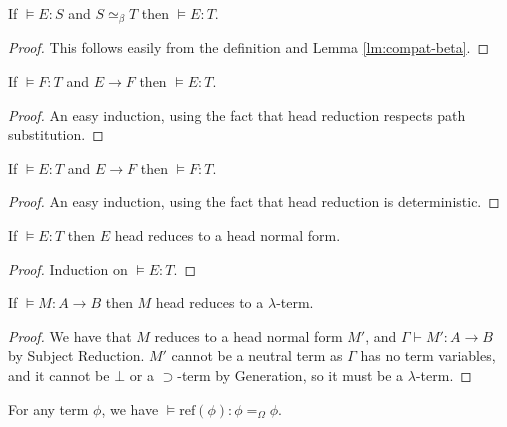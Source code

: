\documentclass[a4paper,UKenglish]{lipics-v2016}
\newcommand*{\reff}[1]{\ensuremath{\mathrm{ref} \left( {#1} \right)}}
\theoremstyle{plain}
\begin{document}
\begin{lemma}
\label{lm:conv-compute}
If $\models E : S$ and $S \simeq_\beta T$ then $\models E : T$.
\end{lemma}

\begin{proof}
This follows easily from the definition and Lemma \ref{lm:compat-beta}.
\end{proof}

\begin{lemma}
If $\models F : T$ and $E \rightarrow F$ then $\models E : T$.
\end{lemma}

\begin{proof}
An easy induction, using the fact that head reduction respects path substitution.
\end{proof}

\begin{lemma}[Reduction]
If $\models E : T$ and $E \rightarrow F$ then $\models F : T$.
\end{lemma}

\begin{proof}
An easy induction, using the fact that head reduction is deterministic.
\end{proof}

\begin{lemma}
If $\models E : T$ then $E$ head reduces to a head normal form.
\end{lemma}

\begin{proof}
Induction on $\models E : T$.
\end{proof}

\begin{lemma}
\label{lm:compute-lambda}
If $\models M : A \rightarrow B$ then $M$ head reduces to a $\lambda$-term.
\end{lemma}

\begin{proof}
We have that $M$ reduces to a head normal form $M'$, and $\Gamma \vdash M' : A \rightarrow B$ by Subject Reduction.
$M'$ cannot be a neutral term as $\Gamma$ has no term variables, and it cannot be $\bot$ or a $\supset$-term by Generation,
so it must be a $\lambda$-term.
\end{proof}

\begin{lemma}
\label{lm:ref-compute-Omega}
For any term $\phi$, we have $\models \reff{\phi} : \phi =_\Omega \phi$.
\end{lemma}
\end{document}
